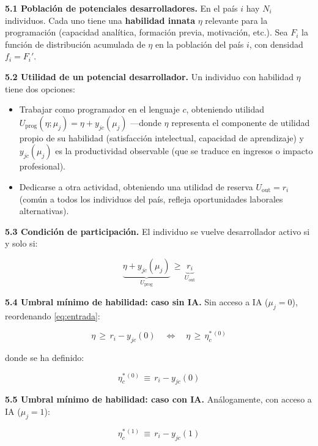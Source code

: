 \documentclass[11pt,a4paper]{article}
\theoremstyle{definition}
\begin{document}
\textbf{5.1 Población de potenciales desarrolladores.} En el país $i$ hay $N_i$ individuos. Cada uno tiene una \textbf{habilidad innata} $\eta$ relevante para la programación (capacidad analítica, formación previa, motivación, etc.). Sea $F_i$ la función de distribución acumulada de $\eta$ en la población del país $i$, con densidad $f_i = F_i'$.

\textbf{5.2 Utilidad de un potencial desarrollador.} Un individuo con habilidad $\eta$ tiene dos opciones:
\begin{itemize}[leftmargin=*]
  \item Trabajar como programador en el lenguaje $c$, obteniendo utilidad $U_{\text{prog}}(\eta;\mu_j) = \eta + y_{jc}(\mu_j)$ ---donde $\eta$ representa el componente de utilidad propio de su habilidad (satisfacción intelectual, capacidad de aprendizaje) y $y_{jc}(\mu_j)$ es la productividad observable (que se traduce en ingresos o impacto profesional).
  \item Dedicarse a otra actividad, obteniendo una utilidad de reserva $U_{\text{out}} = r_i$ (común a todos los individuos del país, refleja oportunidades laborales alternativas).
\end{itemize}

\textbf{5.3 Condición de participación.} El individuo se vuelve desarrollador activo si y solo si:

\begin{equation}
\underbrace{\eta + y_{jc}(\mu_j)}_{U_{\text{prog}}} \,\geq\, \underbrace{r_i}_{U_{\text{out}}}
\label{eq:entrada}
\end{equation}

\textbf{5.4 Umbral mínimo de habilidad: caso sin IA.} Sin acceso a IA ($\mu_j = 0$), reordenando \eqref{eq:entrada}:

\begin{equation}
\eta \,\geq\, r_i - y_{jc}(0) \quad\Longleftrightarrow\quad \eta \,\geq\, \eta_c^{*\,(0)}
\end{equation}

donde se ha definido:

\begin{equation}
\eta_c^{*\,(0)} \,\equiv\, r_i - y_{jc}(0)
\label{eq:umbral0}
\end{equation}

\textbf{5.5 Umbral mínimo de habilidad: caso con IA.} Análogamente, con acceso a IA ($\mu_j = 1$):

\begin{equation}
\eta_c^{*\,(1)} \,\equiv\, r_i - y_{jc}(1)
\label{eq:umbral1}
\end{equation}
\end{document}
